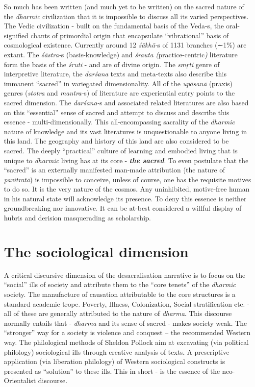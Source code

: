 So much has been written (and much yet to be written) on the sacred nature of the \textit{dharmic} civilization that it is impossible to discuss all its varied perspectives. The Vedic civilization - built on the fundamental basis of the Veda-s, the oral-signified chants of primordial origin that encapsulate “vibrational” basis of cosmological existence. Currently around 12 \textit{śākhā-}s of 1131 branches (∼1\%) are extant. The \textit{śāstra-}s (basis-knowledge) and \textit{śrauta (}practice-centric\textit{)} literature form the basis of the \textit{śruti} - and are of divine origin. The \textit{smṛti} genre of interpretive literature, the \textit{darśana} texts and meta-texts also describe this immanent “sacred” in variegated dimensionality. All of the \textit{upāsanā} (praxis) genres (\textit{stotra} and \textit{mantra-}s) of literature are experiential entry points to the sacred dimension. The \textit{darśana-}s and associated related literatures are also based on this “essential” sense of sacred and attempt to discuss and describe this essence - multi-dimensionally. This all-encompassing sacrality of the \textit{dharmic} nature of knowledge and its vast literatures is unquestionable to anyone living in this land. The geography and history of this land are also considered to be sacred. The deeply “practical” culture of learning and embodied living that is unique to \textit{dharmic} living has at its core - \textbf{\textit{the sacred}}. To even postulate that the “sacred” is an externally manifested man-made attribution (the nature of \textit{pavitratā}) is impossible to conceive, unless of course, one has the requisite motives to do so. It is the very nature of the cosmos. Any uninhibited, motive-free human in his natural state will acknowledge its presence. To deny this essence is neither groundbreaking nor innovative. It can be at-best considered a willful display of hubris and derision masquerading as scholarship.

\newpage


\section*{The sociological dimension}

A critical discursive dimension of the desacralisation narrative is to focus on the “social” ills of society and attribute them to the “core tenets” of the \textit{dharmic} society. The manufacture of causation attributable to the core structures is a standard academic trope. Poverty, Illness, Colonization, Social stratification etc. - all of these are generally attributed to the nature of \textit{dharma}. This discourse normally entails that - \textit{dharma} and its sense of sacred - makes society weak. The “stronger” way for a society is violence and conquest – the recommended Western way. The philological methods of Sheldon Pollock aim at excavating (via political philology) sociological ills through creative analysis of texts. A prescriptive application (via liberation philology) of Western sociological constructs is presented as “solution” to these ills. This in short - is the essence of the neo-Orientalist discourse.

